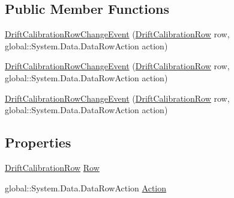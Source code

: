 \subsection*{Public Member Functions}
\begin{DoxyCompactItemize}
\item 
\hyperlink{class_env_int_1_1_win32_1_1_field_tech_1_1_manager_1_1_data_sets_1_1_guide_ware_mobile_data_set_aa92b3413cef1716fa2c99ea466ba9d7_a60c7ff6b337175b1cf90f9f4f019e213}{Drift\+Calibration\+Row\+Change\+Event} (\hyperlink{class_env_int_1_1_win32_1_1_field_tech_1_1_manager_1_1_data_sets_1_1_guide_ware_mobile_data_set_1_1_drift_calibration_row}{Drift\+Calibration\+Row} row, global\+::\+System.\+Data.\+Data\+Row\+Action action)
\item 
\hyperlink{class_env_int_1_1_win32_1_1_field_tech_1_1_manager_1_1_data_sets_1_1_guide_ware_mobile_data_set_aa92b3413cef1716fa2c99ea466ba9d7_a60c7ff6b337175b1cf90f9f4f019e213}{Drift\+Calibration\+Row\+Change\+Event} (\hyperlink{class_env_int_1_1_win32_1_1_field_tech_1_1_manager_1_1_data_sets_1_1_guide_ware_mobile_data_set_1_1_drift_calibration_row}{Drift\+Calibration\+Row} row, global\+::\+System.\+Data.\+Data\+Row\+Action action)
\item 
\hyperlink{class_env_int_1_1_win32_1_1_field_tech_1_1_manager_1_1_data_sets_1_1_guide_ware_mobile_data_set_aa92b3413cef1716fa2c99ea466ba9d7_a60c7ff6b337175b1cf90f9f4f019e213}{Drift\+Calibration\+Row\+Change\+Event} (\hyperlink{class_env_int_1_1_win32_1_1_field_tech_1_1_manager_1_1_data_sets_1_1_guide_ware_mobile_data_set_1_1_drift_calibration_row}{Drift\+Calibration\+Row} row, global\+::\+System.\+Data.\+Data\+Row\+Action action)
\end{DoxyCompactItemize}
\subsection*{Properties}
\begin{DoxyCompactItemize}
\item 
\hyperlink{class_env_int_1_1_win32_1_1_field_tech_1_1_manager_1_1_data_sets_1_1_guide_ware_mobile_data_set_1_1_drift_calibration_row}{Drift\+Calibration\+Row} \hyperlink{class_env_int_1_1_win32_1_1_field_tech_1_1_manager_1_1_data_sets_1_1_guide_ware_mobile_data_set_aa92b3413cef1716fa2c99ea466ba9d7_a4f3a8b6bd5012c08abec46f9f12b1c3a}{Row}
\item 
global\+::\+System.\+Data.\+Data\+Row\+Action \hyperlink{class_env_int_1_1_win32_1_1_field_tech_1_1_manager_1_1_data_sets_1_1_guide_ware_mobile_data_set_aa92b3413cef1716fa2c99ea466ba9d7_a24a154d7828be0a3b8357cc153b3357b}{Action}
\end{DoxyCompactItemize}


